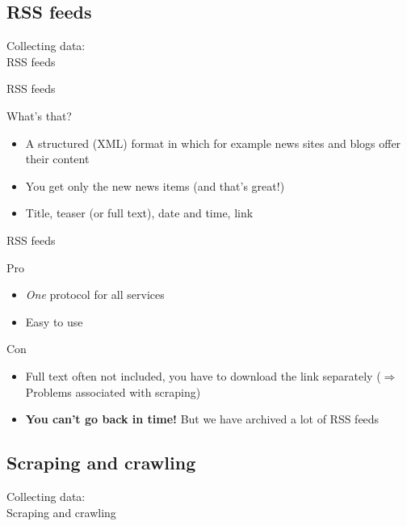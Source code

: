 \documentclass{beamer}
\begin{document}
\subsection{RSS feeds}
\begin{frame}
Collecting data:\\
RSS feeds
\end{frame}

\begin{frame}{RSS feeds}
\begin{block}{What's that?}
\begin{itemize}
\item<1-> A structured (XML) format in which for example news sites and blogs offer their content
\item<2-> You get only the new news items (and that's great!)
\item<3-> Title, teaser (or full text), date and time, link
\end{itemize}
\end{block}
\end{frame}


\begin{frame}{RSS feeds}
\begin{block}{Pro}
\begin{itemize}
\item \emph{One} protocol for all services
\item Easy to use
\end{itemize}
\end{block}

\begin{block}{Con}
\begin{itemize}
\item Full text often not included, you have to download the link separately ($\Rightarrow$ Problems associated with scraping) 
\item {\textbf{You can't go back in time!}} \footnotesize{But we have archived a lot of RSS feeds}
\end{itemize}
\end{block}

\end{frame}

\subsection{Scraping and crawling}
\begin{frame}
Collecting data:\\
Scraping and crawling
\end{frame}
\end{document}
